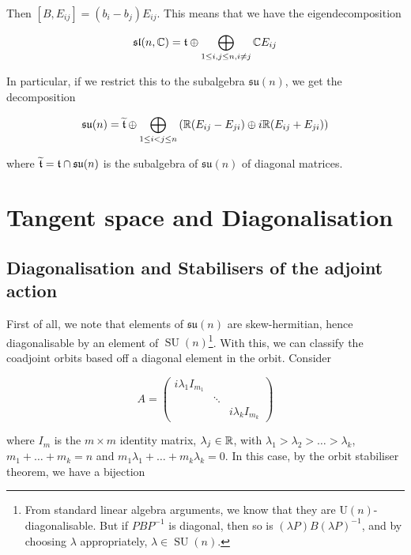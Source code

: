\documentclass{report}
\DeclareMathOperator{\SU}{SU}
\newcommand{\su}{\mathfrak{su}}
\renewcommand{\sl}{\mathfrak{sl}}
\renewcommand{\tilde}{\widetilde}
\begin{document}
Then \([B, E_{ij}] = (b_i - b_j)E_{ij}\). This means that we have the eigendecomposition

\begin{equation}
    \label{eq:sln-root}
    \sl(n, \C) = \mft \oplus \bigoplus_{1 \le i, j \le n, i \ne j} \C E_{ij}
\end{equation}

In particular, if we restrict this to the subalgebra \(\su(n)\), we get the decomposition

\begin{equation}
    \label{eq:sun-root}
    \su(n) = \tilde\mft \oplus \bigoplus_{1 \le i < j \le n} \left(\R(E_{ij} - E_{ji}) \oplus i\R (E_{ij} + E_{ji})\right)
\end{equation}

where \(\tilde \mft = \mft \cap \su(n)\) is the subalgebra of \(\su(n)\) of diagonal matrices. 

\section{Tangent space and Diagonalisation}

\label{sec:tangent}

\subsection{Diagonalisation and Stabilisers of the adjoint action}

First of all, we note that elements of \(\su(n)\) are skew-hermitian, hence diagonalisable by an element of \(\SU(n)\)\footnote{From standard linear algebra arguments, we know that they are \(\mathrm U(n)\)-diagonalisable. But if \(PBP^{-1}\) is diagonal, then so is \((\lambda P)B(\lambda P)^{-1}\), and by choosing \(\lambda\) appropriately, \(\lambda \in \SU(n)\).}. With this, we can classify the coadjoint orbits based off a diagonal element in the orbit. Consider

\[A = \begin{pmatrix}
    i\lambda_1 I_{m_1} \\
    & \ddots \\
    & & i\lambda_k I_{m_k}
\end{pmatrix}\]

where \(I_m\) is the \(m \times m\) identity matrix, \(\lambda_j \in \mathbb{R}\), with \(\lambda_1 > \lambda_2 > \dots > \lambda_k\), \(m_1 + \dots + m_k = n\) and \(m_1\lambda_1 + \dots + m_k\lambda_k = 0\). In this case, by the orbit stabiliser theorem, we have a bijection
\end{document}
